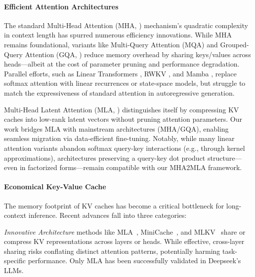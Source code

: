 


\paragraph{Efficient Attention Architectures}  
The standard Multi-Head Attention (MHA, \citeyear{nips/VaswaniSPUJGKP17}) mechanism's quadratic complexity in context length has spurred numerous efficiency innovations. 
While MHA remains foundational, variants like Multi-Query Attention (MQA) and Grouped-Query Attention (GQA, \citeyear{emnlp/AinslieLJZLS23}) reduce memory overhead by sharing keys/values across heads—albeit at the cost of parameter pruning and performance degradation. 
Parallel efforts, such as Linear Transformers \cite{naacl/GuoQLSXZ19,icml/KatharopoulosV020, iclr/ChoromanskiLDSG21}, RWKV \cite{emnlp/PengAAAABCCCDDG23}, and Mamba \cite{corr/abs-2312-00752}, replace softmax attention with linear recurrences or state-space models, but struggle to match the expressiveness of standard attention in autoregressive generation.  

Multi-Head Latent Attention (MLA, \citeyear{corr/abs-2405-04434})  distinguishes itself by compressing KV caches into low-rank latent vectors without pruning attention parameters. 
Our work bridges MLA with mainstream architectures (MHA/GQA), enabling seamless migration via data-efficient fine-tuning.  
Notably, while many linear attention variants abandon softmax query-key interactions (e.g., through kernel approximations), architectures preserving a query-key dot product structure—even in factorized forms—remain compatible with our MHA2MLA framework. 


\paragraph{Economical Key-Value Cache}  
The memory footprint of KV caches has become a critical bottleneck for long-context inference. 
Recent advances fall into three categories:  

\textit{Innovative Architecture} methods like MLA~\cite{corr/abs-2405-04434}, MiniCache~\cite{nips/LiuLPHHZ24}, and MLKV~\cite{corr/abs-2406-09297} share or compress KV representations across layers or heads. 
While effective, cross-layer sharing risks conflating distinct attention patterns, potentially harming task-specific performance. 
Only MLA has been successfully validated in Deepseek's LLMs.

